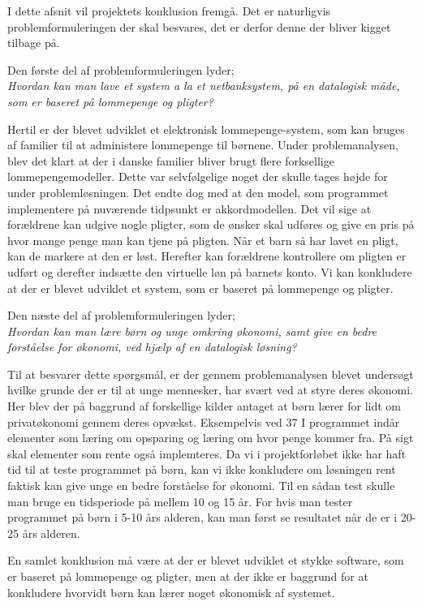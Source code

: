 I dette afsnit vil projektets konklusion fremgå. Det er naturligvis problemformuleringen der skal besvares, det er derfor denne der bliver kigget tilbage på.

Den første del af problemformuleringen lyder;\\
\textit{Hvordan kan man lave et system a la et netbanksystem, på en datalogisk måde, som er baseret på lommepenge og pligter?}

Hertil er der blevet udviklet et elektronisk lommepenge-system, som kan bruges af familier til at administere lommepenge til børnene. Under problemanalysen, blev det klart at der i danske familier bliver brugt flere forksellige lommepengemodeller. Dette var selvfølgelige noget der skulle tages højde for under problemløsningen. Det endte dog med at den model, som programmet implementere på nuværende tidpsunkt er akkordmodellen. Det vil sige at forældrene kan udgive nogle pligter, som de ønsker skal udføres og give en pris på hvor mange penge man kan tjene på pligten. Når et barn så har lavet en pligt, kan de markere at den er løst. Herefter kan forældrene kontrollere om pligten er udført og derefter indsætte den virtuelle løn på barnets konto. Vi kan konkludere at der er blevet udviklet et system, som er baseret på lommepenge og pligter.

Den næste del af problemformuleringen lyder;\\
\textit{Hvordan kan man lære børn og unge omkring økonomi, samt give en bedre forståelse for økonomi, ved hjælp af en datalogisk løsning?}

Til at besvarer dette spørgsmål, er der gennem problemanalysen blevet undersøgt hvilke grunde der er til at unge mennesker, har svært ved at styre deres økonomi. Her blev der på baggrund af forskellige kilder antaget at børn lærer for lidt om privatøkonomi gennem deres opvækst. Eksempelvis ved  37%
I programmet indår elementer som læring om opsparing og læring om hvor penge kommer fra. På sigt skal elementer som rente også implemteres. Da vi i projektforløbet ikke har haft tid til at teste programmet på børn, kan vi ikke konkludere om løsningen rent faktisk kan give unge en bedre forståelse for økonomi. Til en sådan test skulle man bruge en tidsperiode på mellem 10 og 15 år. For hvis man tester programmet på børn i 5-10 års alderen, kan man først se resultatet når de er i 20-25 års alderen. 

En samlet konklusion må være at der er blevet udviklet et stykke software, som er baseret på lommepenge og pligter, men at der ikke er baggrund for at konkludere hvorvidt børn kan lærer noget økonomisk af systemet.